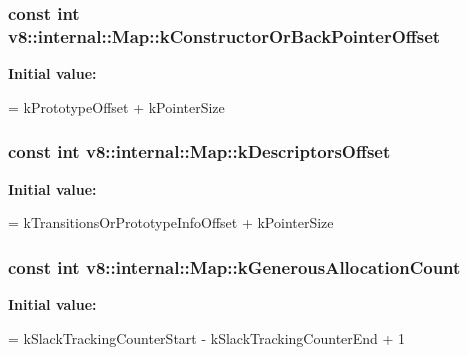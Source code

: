 \subsubsection[{\texorpdfstring{k\+Constructor\+Or\+Back\+Pointer\+Offset}{kConstructorOrBackPointerOffset}}]{\setlength{\rightskip}{0pt plus 5cm}const int v8\+::internal\+::\+Map\+::k\+Constructor\+Or\+Back\+Pointer\+Offset\hspace{0.3cm}{\ttfamily [static]}}\hypertarget{classv8_1_1internal_1_1_map_a969ba7605343dcd1af10f50340fca162}{}\label{classv8_1_1internal_1_1_map_a969ba7605343dcd1af10f50340fca162}
{\bfseries Initial value\+:}
\begin{DoxyCode}
=
      kPrototypeOffset + kPointerSize
\end{DoxyCode}
\subsubsection[{\texorpdfstring{k\+Descriptors\+Offset}{kDescriptorsOffset}}]{\setlength{\rightskip}{0pt plus 5cm}const int v8\+::internal\+::\+Map\+::k\+Descriptors\+Offset\hspace{0.3cm}{\ttfamily [static]}}\hypertarget{classv8_1_1internal_1_1_map_a3d34f199f4ebb5b7d9170c74c2ac5fca}{}\label{classv8_1_1internal_1_1_map_a3d34f199f4ebb5b7d9170c74c2ac5fca}
{\bfseries Initial value\+:}
\begin{DoxyCode}
=
      kTransitionsOrPrototypeInfoOffset + kPointerSize
\end{DoxyCode}
\subsubsection[{\texorpdfstring{k\+Generous\+Allocation\+Count}{kGenerousAllocationCount}}]{\setlength{\rightskip}{0pt plus 5cm}const int v8\+::internal\+::\+Map\+::k\+Generous\+Allocation\+Count\hspace{0.3cm}{\ttfamily [static]}}\hypertarget{classv8_1_1internal_1_1_map_aa0f778fa0a1188086b543f33effd55bf}{}\label{classv8_1_1internal_1_1_map_aa0f778fa0a1188086b543f33effd55bf}
{\bfseries Initial value\+:}
\begin{DoxyCode}
=
      kSlackTrackingCounterStart - kSlackTrackingCounterEnd + 1
\end{DoxyCode}
